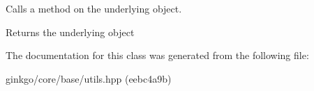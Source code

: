 Calls a method on the underlying object. 

\begin{DoxyReturn}{Returns}
the underlying object 
\end{DoxyReturn}


The documentation for this class was generated from the following file\+:\begin{DoxyCompactItemize}
\item 
ginkgo/core/base/utils.\+hpp (eebc4a9b)\end{DoxyCompactItemize}
